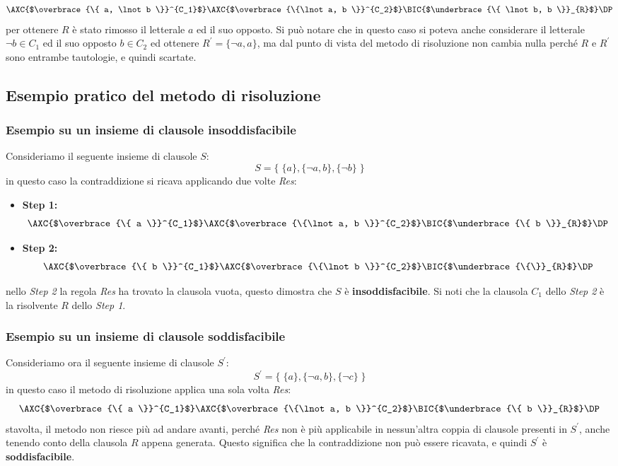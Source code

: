 \documentclass[a4paper,12pt]{report}
\begin{document}
\[
    \AXC{$\overbrace{\{ a, \lnot b \}}^{C_1}$}
    \AXC{$\overbrace{\{\lnot a, b \}}^{C_2}$}
    \RightLabel{Res}
    \BIC{$\underbrace{\{ \lnot b, b \}}_{R}$}
    \DP
\]
per ottenere $R$ è stato rimosso il letterale $a$ ed il suo opposto. Si può notare che in questo caso si poteva anche considerare il letterale $\lnot b \in C_1$ ed il suo opposto $b \in C_2$ ed ottenere $R^{'} = \{ \lnot a, a \}$, ma dal punto di vista del metodo di risoluzione non cambia nulla perché $R$ e $R^{'}$ sono entrambe tautologie, e quindi scartate.

\subsection{Esempio pratico del metodo di risoluzione}
\subsubsection{Esempio su un insieme di clausole insoddisfacibile}
Consideriamo il seguente insieme di clausole $S$:
\[ S = \{ \; \{a\}, \{\lnot a, b\}, \{\lnot b\} \; \} \]
in questo caso la contraddizione si ricava applicando due volte \emph{Res}:

\begin{itemize}
    \item \textbf{Step 1:}
    \[
    \AXC{$\overbrace{\{ a \}}^{C_1}$}
    \AXC{$\overbrace{\{\lnot a, b \}}^{C_2}$}
    \RightLabel{Res}
    \BIC{$\underbrace{\{ b \}}_{R}$}
    \DP
    \]
    \item \textbf{Step 2:}
    \[
    \AXC{$\overbrace{\{ b \}}^{C_1}$}
    \AXC{$\overbrace{\{\lnot b \}}^{C_2}$}
    \RightLabel{Res}
    \BIC{$\underbrace{\{\}}_{R}$}
    \DP
    \]
\end{itemize}
nello \emph{Step 2} la regola \emph{Res} ha trovato la clausola vuota, questo dimostra che $S$ è \textbf{insoddisfacibile}. Si noti che la clausola $C_1$ dello \emph{Step 2} è la risolvente $R$ dello \emph{Step 1}.

\subsubsection{Esempio su un insieme di clausole soddisfacibile}
Consideriamo ora il seguente insieme di clausole $S^{'}$:
\[ S^{'} = \{ \; \{a\}, \{\lnot a, b\}, \{\lnot c\} \; \} \]
in questo caso il metodo di risoluzione applica una sola volta \emph{Res}:
\[
    \AXC{$\overbrace{\{ a \}}^{C_1}$}
    \AXC{$\overbrace{\{\lnot a, b \}}^{C_2}$}
    \RightLabel{Res}
    \BIC{$\underbrace{\{ b \}}_{R}$}
    \DP
\]
stavolta, il metodo non riesce più ad andare avanti, perché \emph{Res} non è più applicabile in nessun'altra coppia di clausole presenti in $S^{'}$, anche tenendo conto della clausola $R$ appena generata. Questo significa che la contraddizione non può essere ricavata, e quindi $S^{'}$ è \textbf{soddisfacibile}.
\end{document}
